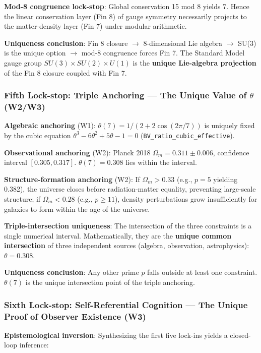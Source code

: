 \documentclass[aps,prd,twocolumn,nofootinbib,floatfix]{revtex4-2}
\begin{document}
\textbf{Mod-8 congruence lock-stop}: Global conservation 15 mod 8 yields 7. Hence the linear conservation layer (Fin 8) of gauge symmetry necessarily projects to the matter-density layer (Fin 7) under modular arithmetic.

\textbf{Uniqueness conclusion}: Fin 8 closure $\to$ 8-dimensional Lie algebra $\to$ SU(3) is the unique option $\to$ mod-8 congruence forces Fin 7. The Standard Model gauge group $SU(3)\times SU(2)\times U(1)$ is the \textbf{unique Lie-algebra projection} of the Fin 8 closure coupled with Fin 7.

\subsubsection*{Fifth Lock-stop: Triple Anchoring --- The Unique Value of $\theta$ (W2/W3)}

\textbf{Algebraic anchoring} (W1): $\theta(7) = 1/(2+2\cos(2\pi/7))$ is uniquely fixed by the cubic equation $\theta^3 - 6\theta^2 + 5\theta - 1 = 0$ (\texttt{BV\_ratio\_cubic\_effective}).

\textbf{Observational anchoring} (W2): Planck 2018 $\Omega_m = 0.311 \pm 0.006$, confidence interval $[0.305, 0.317]$. $\theta(7) = 0.308$ lies within the interval.

\textbf{Structure-formation anchoring} (W2): If $\Omega_m > 0.33$ (e.g., $p=5$ yielding 0.382), the universe closes before radiation-matter equality, preventing large-scale structure; if $\Omega_m < 0.28$ (e.g., $p\geq 11$), density perturbations grow insufficiently for galaxies to form within the age of the universe.

\textbf{Triple-intersection uniqueness}: The intersection of the three constraints is a single numerical interval. Mathematically, they are the \textbf{unique common intersection} of three independent sources (algebra, observation, astrophysics): $\theta = 0.308$.

\textbf{Uniqueness conclusion}: Any other prime $p$ falls outside at least one constraint. $\theta(7)$ is the unique intersection point of the triple anchoring.

\subsubsection*{Sixth Lock-stop: Self-Referential Cognition --- The Unique Proof of Observer Existence (W3)}

\textbf{Epistemological inversion}: Synthesizing the first five lock-ins yields a closed-loop inference:
\end{document}

